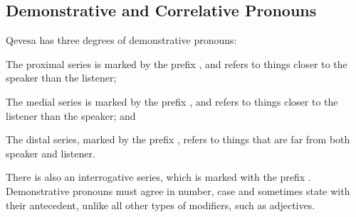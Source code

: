\documentclass[grammar]{subfiles}
\begin{document}


  \subsection{Demonstrative and Correlative Pronouns}
  \label{ssec:nm_demonstrative_pronouns}

  Qevesa has three degrees of demonstrative pronouns:

  \begin{description}[style=nextline]
    \item[Proximal] The proximal series is marked by the prefix , and refers to things closer to the speaker than the listener;
    \item[Medial] The medial series is marked by the prefix , and refers to things closer to the listener than the speaker; and
    \item[Distal] The distal series, marked by the prefix , refers to things that are far from both speaker and listener.
  \end{description}

  There is also an interrogative series, which is marked with the prefix . Demonstrative pronouns must agree in number, case and sometimes state with their antecedent, unlike all other types of modifiers, such as adjectives. 
\end{document}
